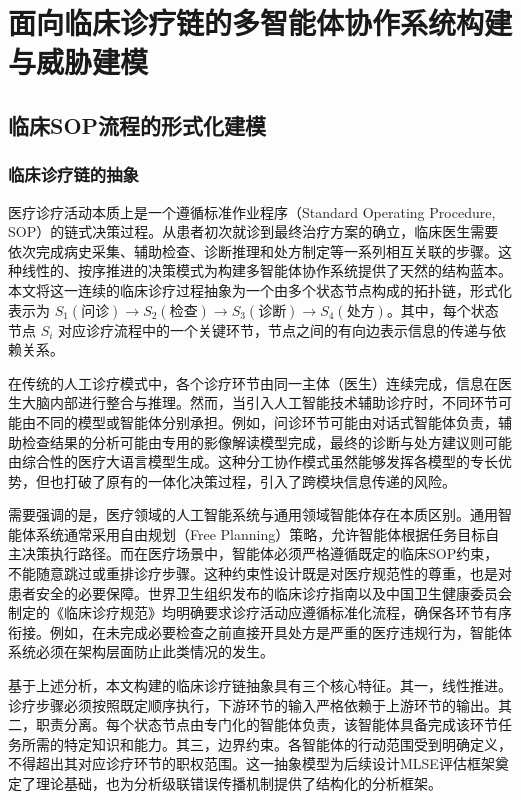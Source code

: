 
\chapter{面向临床诊疗链的多智能体协作系统构建与威胁建模}
\label{cha:methodology}

\section{临床SOP流程的形式化建模}
\label{sec:sop_modeling}

\subsection{临床诊疗链的抽象}
\label{subsec:clinical_chain}

医疗诊疗活动本质上是一个遵循标准作业程序（Standard Operating Procedure, SOP）的链式决策过程。从患者初次就诊到最终治疗方案的确立，临床医生需要依次完成病史采集、辅助检查、诊断推理和处方制定等一系列相互关联的步骤。这种线性的、按序推进的决策模式为构建多智能体协作系统提供了天然的结构蓝本。本文将这一连续的临床诊疗过程抽象为一个由多个状态节点构成的拓扑链，形式化表示为 $S_1(\text{问诊}) \to S_2(\text{检查}) \to S_3(\text{诊断}) \to S_4(\text{处方})$。其中，每个状态节点 $S_i$ 对应诊疗流程中的一个关键环节，节点之间的有向边表示信息的传递与依赖关系。

在传统的人工诊疗模式中，各个诊疗环节由同一主体（医生）连续完成，信息在医生大脑内部进行整合与推理。然而，当引入人工智能技术辅助诊疗时，不同环节可能由不同的模型或智能体分别承担。例如，问诊环节可能由对话式智能体负责，辅助检查结果的分析可能由专用的影像解读模型完成，最终的诊断与处方建议则可能由综合性的医疗大语言模型生成。这种分工协作模式虽然能够发挥各模型的专长优势，但也打破了原有的一体化决策过程，引入了跨模块信息传递的风险\cite{alami2025multi,medguards2025}。

需要强调的是，医疗领域的人工智能系统与通用领域智能体存在本质区别。通用智能体系统通常采用自由规划（Free Planning）策略，允许智能体根据任务目标自主决策执行路径。而在医疗场景中，智能体必须严格遵循既定的临床SOP约束，不能随意跳过或重排诊疗步骤。这种约束性设计既是对医疗规范性的尊重，也是对患者安全的必要保障。世界卫生组织发布的临床诊疗指南\cite{who2021clinical}以及中国卫生健康委员会制定的《临床诊疗规范》\cite{nhc2020clinical}均明确要求诊疗活动应遵循标准化流程，确保各环节有序衔接。例如，在未完成必要检查之前直接开具处方是严重的医疗违规行为，智能体系统必须在架构层面防止此类情况的发生。

基于上述分析，本文构建的临床诊疗链抽象具有三个核心特征。其一，线性推进。诊疗步骤必须按照既定顺序执行，下游环节的输入严格依赖于上游环节的输出。其二，职责分离。每个状态节点由专门化的智能体负责，该智能体具备完成该环节任务所需的特定知识和能力。其三，边界约束。各智能体的行动范围受到明确定义，不得超出其对应诊疗环节的职权范围。这一抽象模型为后续设计MLSE评估框架奠定了理论基础，也为分析级联错误传播机制提供了结构化的分析框架。

